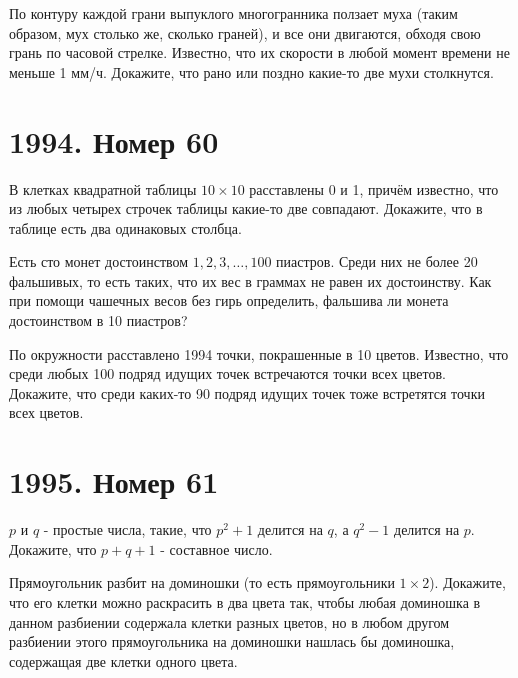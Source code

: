 \documentclass[11pt, a4paper]{common/document_template}
\begin{document}
\begin{exercise}[64]
По контуру каждой грани выпуклого многогранника ползает муха (таким образом, мух столько же, сколько граней), и все они двигаются, обходя свою грань по часовой стрелке. Известно, что их скорости в любой момент времени не меньше 1 мм/ч. Докажите, что рано или поздно какие-то две мухи столкнутся.
\end{exercise}

\chapter{1994. Номер 60}

\begin{exercise}
В клетках квадратной таблицы $10 \times 10$ расставлены 0 и 1, причём известно, что из любых четырех строчек таблицы какие-то две совпадают. Докажите, что в таблице есть два одинаковых столбца.
\end{exercise}

\begin{exercise}
Есть сто монет достоинством $1, 2, 3, \dots, 100$ пиастров. Среди них не более 20 фальшивых, то есть таких, что их вес в граммах не равен их достоинству. Как при помощи чашечных весов без гирь определить, фальшива ли монета достоинством в 10 пиастров?
\end{exercise}

\begin{exercise}
По окружности расставлено 1994 точки, покрашенные в 10 цветов. Известно, что среди любых 100 подряд идущих точек встречаются точки всех цветов. Докажите, что среди каких-то 90 подряд идущих точек тоже встретятся точки всех цветов.
\end{exercise}

\chapter{1995. Номер 61}

\begin{exercise}
$p$ и $q$ - простые числа, такие, что $p^{2} + 1$ делится на $q$, а $q^{2} - 1$ делится на $p$. Докажите, что $p + q + 1$ - составное число.
\end{exercise}

\begin{exercise}
Прямоугольник разбит на доминошки (то есть прямоугольники $1 \times 2$). Докажите, что его клетки можно раскрасить в два цвета так, чтобы любая доминошка в данном разбиении содержала клетки разных цветов, но в любом другом разбиении этого прямоугольника на доминошки нашлась бы доминошка, содержащая две клетки одного цвета.
\end{exercise}
\end{document}
